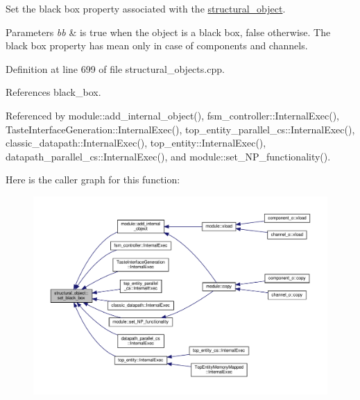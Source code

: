 Set the black box property associated with the \hyperlink{classstructural__object}{structural\+\_\+object}. 


\begin{DoxyParams}{Parameters}
{\em bb} & is true when the object is a black box, false otherwise. The black box property has mean only in case of components and channels. \\
\hline
\end{DoxyParams}


Definition at line 699 of file structural\+\_\+objects.\+cpp.



References black\+\_\+box.



Referenced by module\+::add\+\_\+internal\+\_\+object(), fsm\+\_\+controller\+::\+Internal\+Exec(), Taste\+Interface\+Generation\+::\+Internal\+Exec(), top\+\_\+entity\+\_\+parallel\+\_\+cs\+::\+Internal\+Exec(), classic\+\_\+datapath\+::\+Internal\+Exec(), top\+\_\+entity\+::\+Internal\+Exec(), datapath\+\_\+parallel\+\_\+cs\+::\+Internal\+Exec(), and module\+::set\+\_\+\+N\+P\+\_\+functionality().

Here is the caller graph for this function\+:
\nopagebreak
\begin{figure}[H]
\begin{center}
\leavevmode
\includegraphics[width=350pt]{d8/da3/classstructural__object_a20aae199c4cd2f5d9877f753bb1426f8_icgraph}
\end{center}
\end{figure}
\mbox{\label{classstructural__object_a9f0eed2702c3b6d4ae0931eee452ec6a}} 

